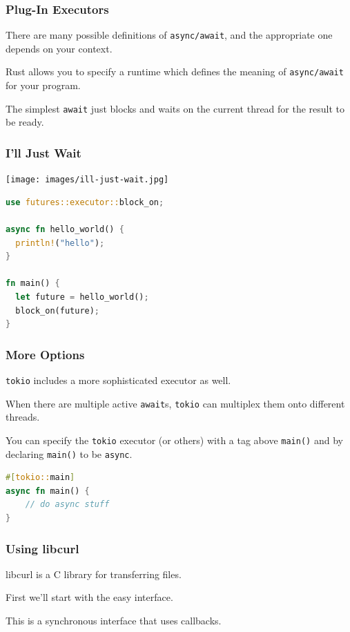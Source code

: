 \begin{frame}
\frametitle{Plug-In Executors}

There are many possible definitions of \texttt{async/await}, and the appropriate one depends on your context. 

Rust allows you to specify a runtime
which defines the meaning of \texttt{async/await} for your program.

The simplest \texttt{await} just blocks and waits on the current
thread for the result to be ready. 

\end{frame}


\begin{frame}[fragile]
\frametitle{I'll Just Wait}
\begin{center}
	\texttt{[image: images/ill-just-wait.jpg]}
\end{center}


\begin{lstlisting}[language=Rust]
use futures::executor::block_on;

async fn hello_world() {
  println!("hello");
}

fn main() {
  let future = hello_world();
  block_on(future);
}
\end{lstlisting}

\end{frame}

\begin{frame}[fragile]
\frametitle{More Options}

\texttt{tokio} includes a more sophisticated executor as well. 

When there are multiple active \texttt{await}s, \texttt{tokio} can multiplex them onto different threads. 

You can specify the \texttt{tokio} executor (or others) with a
tag above {\tt main()} and by declaring \texttt{main()} to be \texttt{async}.

\begin{lstlisting}[language=Rust]
#[tokio::main]
async fn main() {
    // do async stuff
}
\end{lstlisting}

\end{frame}

\begin{frame}
\frametitle{Using libcurl}

libcurl is a C library for transferring files. 

First we'll start with the easy interface. 

This is a synchronous interface
that uses callbacks. 

\end{frame}


